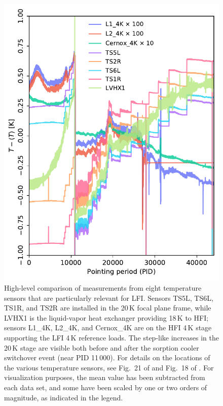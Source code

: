 \documentclass{aa}
\begin{document}
\begin{figure}
  \begin{center}
    \includegraphics[width=\linewidth]{figs/hk_all.pdf}
  \end{center}
  \caption{High-level comparison of measurements from eight
    temperature sensors that are particularly relevant for
    LFI. Sensors TS5L, TS6L, TS1R, and TS2R are installed in the 20\,K
    focal plane frame, while LVHX1 is the liquid-vapor heat exchanger
    providing 18\,K to HFI; sensors L1\_4K, L2\_4K, and Cernox\_4K are on
    the HFI 4\,K stage supporting the LFI 4\,K reference loads. The
    step-like increases in the 20\,K stage are visible both before and
    after the sorption cooler switchover event (near PID 11\,000).
    For
    details on the locations of the various temperature sensors, see Fig.~21
    of \citet{bersanelli2010} and Fig.~18 of \citet{lamarre2010}. For
    visualization purposes, the mean value has been subtracted from
    each data set, and some have been scaled by one or two orders of
    magnitude, as indicated in the legend. 
    \label{fig:hk_all}}
\end{figure}
\end{document}
